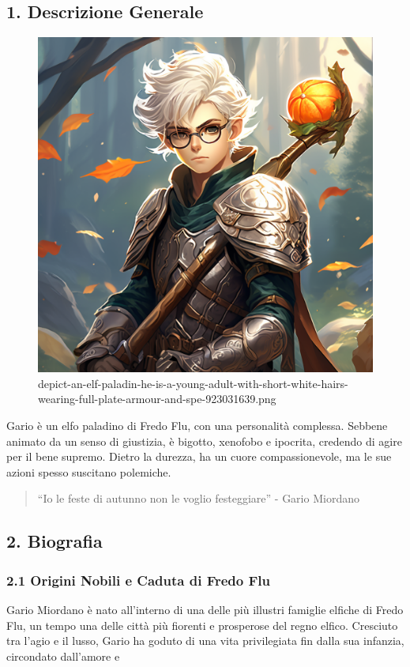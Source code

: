 \subsection{1. Descrizione Generale}\label{descrizione-generale}


\begin{figure}
\centering
\includegraphics{depict-an-elf-paladin-he-is-a-young-adult-with-short-white-hairs-wearing-full-plate-armour-and-spe-923031639.png}
\caption{depict-an-elf-paladin-he-is-a-young-adult-with-short-white-hairs-wearing-full-plate-armour-and-spe-923031639.png}
\end{figure}

Gario è un elfo paladino di Fredo Flu, con una personalità complessa.
Sebbene animato da un senso di giustizia, è bigotto, xenofobo e
ipocrita, credendo di agire per il bene supremo. Dietro la durezza, ha
un cuore compassionevole, ma le sue azioni spesso suscitano polemiche.

\begin{quote}
``Io le feste di autunno non le voglio festeggiare'' - Gario Miordano
\end{quote}

\subsection{2. Biografia}\label{biografia}


\subsubsection{\texorpdfstring{\textbf{2.1 Origini Nobili e Caduta di
Fredo
Flu}}{2.1 Origini Nobili e Caduta di Fredo Flu}}\label{origini-nobili-e-caduta-di-fredo-flu}

Gario Miordano è nato all'interno di una delle più illustri famiglie
elfiche di Fredo Flu, un tempo una delle città più fiorenti e prosperose
del regno elfico. Cresciuto tra l'agio e il lusso, Gario ha goduto di
una vita privilegiata fin dalla sua infanzia, circondato dall'amore e
